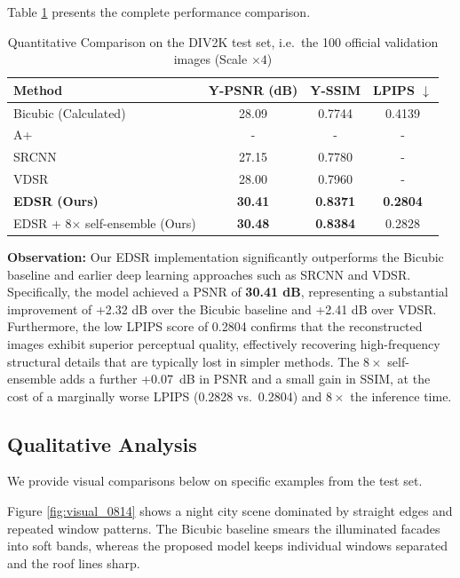 \documentclass[a4paper,11pt]{article}
\begin{document}
Table \ref{tab:final_results} presents the complete performance comparison.

\begin{table}[H]
\centering
\caption{Quantitative Comparison on the DIV2K test set, i.e.\ the 100 official validation images (Scale $\times4$)}
\label{tab:final_results}
\begin{tabularx}{0.95\textwidth}{X c c c}
\toprule
\textbf{Method} & \textbf{Y-PSNR (dB)} & \textbf{Y-SSIM} & \textbf{LPIPS} $\downarrow$ \\
\midrule
Bicubic (Calculated) & 28.09 & 0.7744 & 0.4139 \\
A+ \cite{timofte2014} & - & - & - \\
SRCNN \cite{dong2014} & 27.15 & 0.7780 & - \\
VDSR \cite{kim2016} & 28.00 & 0.7960 & - \\
\midrule
\textbf{EDSR (Ours)} & \textbf{30.41} & \textbf{0.8371} & \textbf{0.2804} \\

EDSR + 8$\times$ self-ensemble (Ours) & \textbf{30.48} & \textbf{0.8384} & 0.2828 \\			
\bottomrule
\end{tabularx}
\end{table}

\medskip

\medskip

\textbf{Observation:} Our EDSR implementation significantly outperforms the Bicubic baseline and earlier deep learning approaches such as SRCNN and VDSR. Specifically, the model achieved a PSNR of \textbf{30.41 dB}, representing a substantial improvement of +2.32 dB over the Bicubic baseline and +2.41 dB over VDSR. Furthermore, the low LPIPS score of 0.2804 confirms that the reconstructed images exhibit superior perceptual quality, effectively recovering high-frequency structural details that are typically lost in simpler methods. The $8\times$ self-ensemble adds a further +0.07~dB in PSNR and a small gain
in SSIM, at the cost of a marginally worse LPIPS (0.2828 vs.\ 0.2804) and
$8\times$ the inference time.


\subsection{Qualitative Analysis}
We provide visual comparisons below on specific examples from the test set.

\medskip

Figure \ref{fig:visual_0814} shows a night city scene dominated by straight edges and repeated window patterns. The Bicubic baseline smears the illuminated facades into soft bands, whereas the proposed model keeps individual windows separated and the roof lines sharp.
\end{document}
